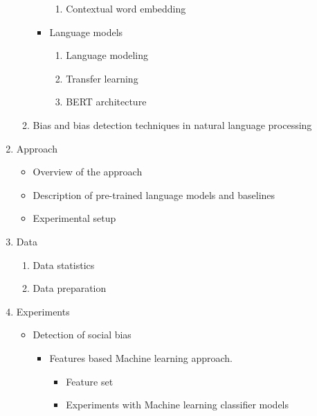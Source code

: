 \begin{enumerate}
\begin{enumerate}
\begin{itemize}
\begin{enumerate}
                    \item Contextual word embedding
                \end{enumerate}
            \item Language models
                \begin{enumerate}
                    \item Language modeling
                    \item Transfer learning
                    \item BERT architecture
                \end{enumerate}
        \end{itemize}
            \item Bias and bias detection techniques in natural language processing
        \end{enumerate}
    \item Approach 
        \begin{itemize}
        \item Overview of the approach
        \item Description of pre-trained language models and baselines
        \item Experimental setup
        \end{itemize} 
    \item Data 
        \begin{enumerate}
            \item Data statistics 
            \item Data preparation 
        \end{enumerate}
    \item Experiments 
        \begin{itemize}
        \item Detection of social bias
            \begin{itemize}
                \item Features based Machine learning approach.
                \begin{itemize}
                    \item Feature set
                    \item Experiments with Machine learning classifier models

\end{itemize}
\end{itemize}
\end{itemize}
\end{enumerate}
